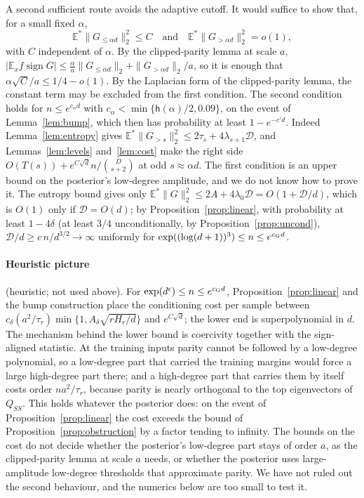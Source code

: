 \documentclass[11pt]{article}
\theoremstyle{definition}\newtheorem{assumption}[theorem]{Assumption}
\theoremstyle{remark}\newtheorem{remark}[theorem]{Remark}
\DeclareMathOperator{\sign}{sign}
\newcommand{\E}{\mathbb E}
\begin{document}
A second sufficient route avoids the adaptive cutoff. It would suffice to
show that, for a small fixed $\alpha$,
\[
 \E^*\|G_{\le\alpha d}\|_2^2\le C\quad\text{and}\quad
 \E^*\|G_{>\alpha d}\|_2^2=o(1),
\]
with $C$ independent of $\alpha$. By the clipped-parity lemma at scale $a$,
$|\E_xf\sign G|\le\frac\alpha a\|G_{\le\alpha d}\|_2+\|G_{>\alpha d}\|_2/a$,
so it is enough that $\alpha\sqrt C/a\le1/4-o(1)$. By the Laplacian form
\cite[eq.~(23)]{subcritical} of the clipped-parity lemma, the constant term
may be excluded from the first condition. The second condition
holds for $n\le e^{c_\alpha d}$ with
$c_\alpha<\min\{\mathsf h(\alpha)/2,0.09\}$, on the event of
Lemma~\ref{lem:bump}, which then has probability at least
$1-e^{-c'd}$. Indeed Lemma~\ref{lem:entropy} gives
$\E^*\|G_{>s}\|_2^2\le2\tau_s+4\lambda_{s+1}\mathcal D$, and
Lemmas~\ref{lem:levels} and~\ref{lem:cost} make the right side
$O(T(s))+e^{C\sqrt d}n/\binom D{s+2}$ at odd $s\approx\alpha d$. The first
condition is an upper bound on the posterior's low-degree amplitude, and
we do not know how to prove it. The entropy bound gives only
$\E^*\|G\|_2^2\le2A+4\lambda_0\mathcal D=O(1+\mathcal D/d)$, which is
$O(1)$ only if $\mathcal D=O(d)$; by Proposition~\ref{prop:linear}, with
probability at least $1-4\delta$ (at least $3/4$ unconditionally, by
Proposition~\ref{prop:uncond}), $\mathcal D/d\ge c\,n/d^{3/2}\to\infty$
uniformly for $\exp((\log(d+1))^3)\le n\le e^{c_{\rm G}d}$.

\paragraph{Heuristic picture} (heuristic; not used above). For
$\exp(d^\epsilon)\le n\le e^{c_{\rm G}d}$, Proposition~\ref{prop:linear} and
the bump construction place the conditioning cost per sample between
$c_\delta(a^2/\tau_r)\min\{1,A_\delta\sqrt{rH_r/d}\}$ and $e^{C\sqrt d}$; the
lower end is superpolynomial in $d$. The mechanism behind the lower bound
is coercivity together with the sign-aligned statistic. At the training
inputs parity cannot be followed by a low-degree polynomial, so a
low-degree part that carried the training margins would force a large
high-degree part there; and a high-degree part that carries them by itself
costs order $na^2/\tau_r$, because parity is nearly orthogonal to the top
eigenvectors of $Q_{SS}$. This holds whatever the posterior does: on the
event of Proposition~\ref{prop:linear} the cost exceeds the bound of
Proposition~\ref{prop:obstruction} by a factor tending to infinity. The
bounds on the cost do not decide whether the posterior's low-degree part
stays of order $a$, as the clipped-parity lemma at scale $a$ needs, or
whether the posterior uses large-amplitude low-degree thresholds that
approximate parity. We have not ruled out the second behaviour, and the
numerics below are too small to test it.
\end{document}
